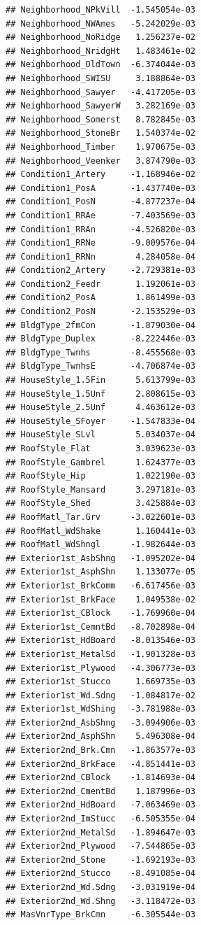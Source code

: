 \documentclass[
]{article}
\begin{document}
\begin{verbatim}
## Neighborhood_NPkVill  -1.545054e-03
## Neighborhood_NWAmes   -5.242029e-03
## Neighborhood_NoRidge   1.256237e-02
## Neighborhood_NridgHt   1.483461e-02
## Neighborhood_OldTown  -6.374044e-03
## Neighborhood_SWISU     3.188864e-03
## Neighborhood_Sawyer   -4.417205e-03
## Neighborhood_SawyerW   3.282169e-03
## Neighborhood_Somerst   8.782845e-03
## Neighborhood_StoneBr   1.540374e-02
## Neighborhood_Timber    1.970675e-03
## Neighborhood_Veenker   3.874790e-03
## Condition1_Artery     -1.168946e-02
## Condition1_PosA       -1.437740e-03
## Condition1_PosN       -4.877237e-04
## Condition1_RRAe       -7.403569e-03
## Condition1_RRAn       -4.526820e-03
## Condition1_RRNe       -9.009576e-04
## Condition1_RRNn        4.284058e-04
## Condition2_Artery     -2.729381e-03
## Condition2_Feedr       1.192061e-03
## Condition2_PosA        1.861499e-03
## Condition2_PosN       -2.153529e-03
## BldgType_2fmCon       -1.879030e-04
## BldgType_Duplex       -8.222446e-03
## BldgType_Twnhs        -8.455568e-03
## BldgType_TwnhsE       -4.706874e-03
## HouseStyle_1.5Fin      5.613799e-03
## HouseStyle_1.5Unf      2.808615e-03
## HouseStyle_2.5Unf      4.463612e-03
## HouseStyle_SFoyer     -1.547833e-04
## HouseStyle_SLvl        5.034037e-04
## RoofStyle_Flat         3.039623e-03
## RoofStyle_Gambrel      1.624377e-03
## RoofStyle_Hip          1.022190e-03
## RoofStyle_Mansard      3.297181e-03
## RoofStyle_Shed         3.425884e-03
## RoofMatl_Tar.Grv      -3.022601e-03
## RoofMatl_WdShake       1.160441e-03
## RoofMatl_WdShngl      -1.982644e-03
## Exterior1st_AsbShng   -1.095202e-04
## Exterior1st_AsphShn    1.133077e-05
## Exterior1st_BrkComm   -6.617456e-03
## Exterior1st_BrkFace    1.049538e-02
## Exterior1st_CBlock    -1.769960e-04
## Exterior1st_CemntBd   -8.702898e-04
## Exterior1st_HdBoard   -8.013546e-03
## Exterior1st_MetalSd   -1.901328e-03
## Exterior1st_Plywood   -4.306773e-03
## Exterior1st_Stucco     1.669735e-03
## Exterior1st_Wd.Sdng   -1.084817e-02
## Exterior1st_WdShing   -3.781988e-03
## Exterior2nd_AsbShng   -3.094906e-03
## Exterior2nd_AsphShn    5.496308e-04
## Exterior2nd_Brk.Cmn   -1.863577e-03
## Exterior2nd_BrkFace   -4.851441e-03
## Exterior2nd_CBlock    -1.814693e-04
## Exterior2nd_CmentBd    1.187996e-03
## Exterior2nd_HdBoard   -7.063469e-03
## Exterior2nd_ImStucc   -6.505355e-04
## Exterior2nd_MetalSd   -1.894647e-03
## Exterior2nd_Plywood   -7.544865e-03
## Exterior2nd_Stone     -1.692193e-03
## Exterior2nd_Stucco    -8.491085e-04
## Exterior2nd_Wd.Sdng   -3.031919e-04
## Exterior2nd_Wd.Shng   -3.118472e-03
## MasVnrType_BrkCmn     -6.305544e-03

\end{verbatim}
\end{document}
